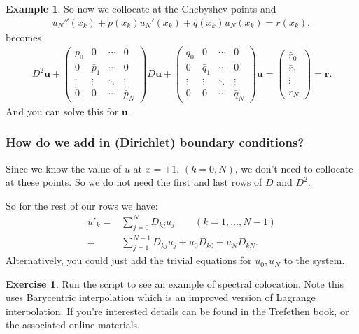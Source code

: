 \documentclass[12pt, a4paper]{article}
\renewcommand{\vec}[1]{\mathbf{#1}}
\theoremstyle{definition}
\newtheorem{example}[thm]{Example}
\newtheorem{exercise}[thm]{Exercise}
\theoremstyle{remark}
\numberwithin{equation}{section}
\begin{document}
\begin{example}
So now we collocate at the Chebyshev points and
\begin{align*}
u_N''(x_k)+\bar{p}(x_k)u_N'(x_k)+\bar{q}(x_k)u_N(x_k)=\bar{r}(x_k),
\end{align*}
becomes
\begin{align*}
D^2\vec{u}+
\begin{pmatrix}
\bar{p}_0 & 0 & \cdots & 0 \\
0 & \bar{p}_1 & \cdots & 0 \\
\vdots & \vdots & \ddots & \vdots \\
0 & 0 & \cdots & \bar{p}_N
\end{pmatrix}
D \vec{u}
+
\begin{pmatrix}
\bar{q}_0 & 0 & \cdots & 0 \\
0 & \bar{q}_1 & \cdots & 0 \\
\vdots & \vdots & \ddots & \vdots \\
0 & 0 & \cdots & \bar{q}_N
\end{pmatrix}
\vec{u}
=
\begin{pmatrix}
\bar{r}_0 \\
\bar{r}_1 \\
 \vdots \\
\bar{r}_N
\end{pmatrix}
=\bar{\vec{r}}.
\end{align*}
And you can solve this for $\mathbf{u}$.

\end{example}

\newpage
\subsubsection*{How do we add in (Dirichlet) boundary conditions?}

Since we know the value of $u$ at $x=\pm1$, $(k=0,N)$, we don't need to collocate at these points. 
So we do not need the first and last rows of $D$ and $D^2$.

So for the rest of our rows we have:
\begin{align*}
u'_k =& \sum_{j=0}^{N}D_{kj}u_j \qquad (k=1,\dots,N-1)\\
=&\sum_{j=1}^{N-1}D_{kj}u_j +u_0 D_{k0}+u_N D_{kN}.
\end{align*}
Alternatively, you could just add the trivial equations for $u_0, u_N$ to the system. 

\begin{exercise}
Run the script  to see an example of spectral colocation. Note this uses Barycentric interpolation which is an improved version of Lagrange interpolation. If you're interested details can be found in the Trefethen book, or the associated online materials.
\end{exercise}
\end{document}
